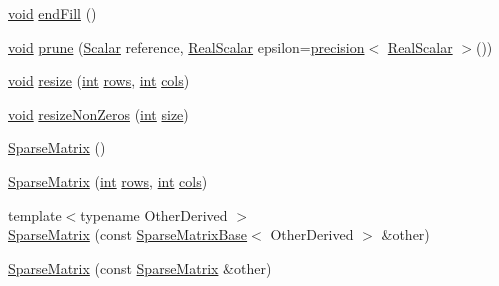 \begin{DoxyCompactItemize}
\item 
\hyperlink{group___u_a_v_objects_plugin_ga444cf2ff3f0ecbe028adce838d373f5c}{void} \hyperlink{class_sparse_matrix_ab362ed3d0853bb7296258c0a97066b59}{end\-Fill} ()
\item 
\hyperlink{group___u_a_v_objects_plugin_ga444cf2ff3f0ecbe028adce838d373f5c}{void} \hyperlink{class_sparse_matrix_a6c86de495216355687f5c7544b558f84}{prune} (\hyperlink{class_sparse_matrix_base_af39d70f2b7e775e9e17b666cd24128c8}{Scalar} reference, \hyperlink{class_sparse_matrix_base_a615d56082efd03b5f31015cc4900e72f}{Real\-Scalar} epsilon=\hyperlink{_math_functions_8h_a3dc1c65cf9dc9b5a7ee66472d0ae83e1}{precision}$<$ \hyperlink{class_sparse_matrix_base_a615d56082efd03b5f31015cc4900e72f}{Real\-Scalar} $>$())
\item 
\hyperlink{group___u_a_v_objects_plugin_ga444cf2ff3f0ecbe028adce838d373f5c}{void} \hyperlink{class_sparse_matrix_acde8fa6d02609ffe50f595a9c0410dde}{resize} (\hyperlink{ioapi_8h_a787fa3cf048117ba7123753c1e74fcd6}{int} \hyperlink{class_sparse_matrix_a54e7073b45d3569ab2a0e144e244c459}{rows}, \hyperlink{ioapi_8h_a787fa3cf048117ba7123753c1e74fcd6}{int} \hyperlink{class_sparse_matrix_a6b7077709307ec5110dea0644a9930f8}{cols})
\item 
\hyperlink{group___u_a_v_objects_plugin_ga444cf2ff3f0ecbe028adce838d373f5c}{void} \hyperlink{class_sparse_matrix_a2f6709b6902ff5b74dbef3498b8fd98c}{resize\-Non\-Zeros} (\hyperlink{ioapi_8h_a787fa3cf048117ba7123753c1e74fcd6}{int} \hyperlink{glext_8h_a014d89bd76f74ef3a29c8f04b473eb76}{size})
\item 
\hyperlink{class_sparse_matrix_a933321862a7b32c203ad574fec657fbe}{Sparse\-Matrix} ()
\item 
\hyperlink{class_sparse_matrix_a710f04372c42c9bd70307576dc8885b1}{Sparse\-Matrix} (\hyperlink{ioapi_8h_a787fa3cf048117ba7123753c1e74fcd6}{int} \hyperlink{class_sparse_matrix_a54e7073b45d3569ab2a0e144e244c459}{rows}, \hyperlink{ioapi_8h_a787fa3cf048117ba7123753c1e74fcd6}{int} \hyperlink{class_sparse_matrix_a6b7077709307ec5110dea0644a9930f8}{cols})
\item 
{\footnotesize template$<$typename Other\-Derived $>$ }\\\hyperlink{class_sparse_matrix_ae183ecdd3a06670810b33f70628db3cf}{Sparse\-Matrix} (const \hyperlink{class_sparse_matrix_base}{Sparse\-Matrix\-Base}$<$ Other\-Derived $>$ \&other)
\item 
\hyperlink{class_sparse_matrix_afb6ffb4d545e855649caefd97b5c046b}{Sparse\-Matrix} (const \hyperlink{class_sparse_matrix}{Sparse\-Matrix} \&other)

\end{DoxyCompactItemize}
